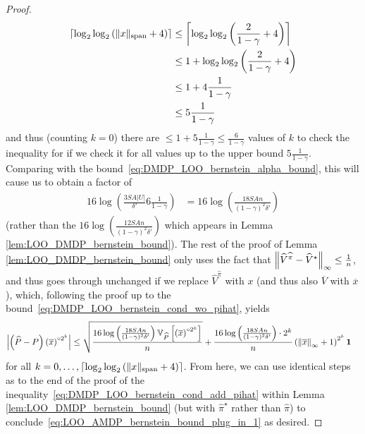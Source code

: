 \documentclass{article}
\theoremstyle{plain}
\theoremstyle{plain}
\theoremstyle{remark}
\theoremstyle{plain}
\theoremstyle{plain}
\newcommand{\Var}{\mathbb{V}}
\newcommand{\Phat}{\widehat{P}}
\newcommand{\Vhat}{\widehat{V}}
\newcommand{\pihstar}{\widehat{\pi}^\star}
\newcommand{\one}{\mathbf{1}}
\newcommand{\pihat}{\widehat{\pi}}
\newcommand{\Vc}{\overline{V}}
\newcommand{\ox}{\overline{x}}
\begin{document}
\begin{proof}
\begin{align*}
    \left\lceil\log_2 \log_2 \left( \Vert x\Vert _{\textnormal{span}} + 4\right) \right\rceil &\leq \left\lceil\log_2 \log_2 \left( \frac{2}{1-\gamma} + 4\right) \right\rceil \\
     &\leq 1 + \log_2 \log_2 \left( \frac{2}{1-\gamma} + 4\right) \\
     &\leq 1 + 4 \frac{1}{1-\gamma} \\
     & \leq 5 \frac{1}{1-\gamma} 
    \end{align*}
    and thus (counting $k = 0$) there are $\leq 1 + 5 \frac{1}{1-\gamma} \leq \frac{6}{1-\gamma}$ values of $k$ to check the inequality for if we check it for all values up to the upper bound $5 \frac{1}{1-\gamma}$. Comparing with the bound~\eqref{eq:DMDP_LOO_bernstein_alpha_bound}, this will cause us to obtain a factor of
    \begin{align*}
        16 \log \left(\frac{3 SA |U|}{\delta'} 6 \frac{1}{1-\gamma} \right) & = 16 \log \left(\frac{18 SA n}{(1-\gamma)^2\delta'} \right)
    \end{align*}
    (rather than the $16 \log \left(\frac{12 SA n}{(1-\gamma)^2\delta'} \right)$ which appears in Lemma \ref{lem:LOO_DMDP_bernstein_bound}).
    The rest of the proof of Lemma \ref{lem:LOO_DMDP_bernstein_bound} only uses the fact that $\infnorm{\Vhat^{\pihat} - \Vhat^{\star}} \leq \frac{1}{n}$, and thus goes through unchanged if we replace $\Vhat^{\pihat}$ with $x$ (and thus also $\Vc$ with $\ox$), which, following the proof up to the bound~\eqref{eq:DMDP_LOO_bernstein_cond_wo_pihat}, yields
    \begin{align*}
        \left| \left(\Phat - P\right) \left( \ox \right)^{\circ 2^k} \right|
    &\leq \sqrt{\frac{16 \log \left(\frac{18 SA n}{(1-\gamma)^2\delta'} \right)   \Var_{\Phat} \left[ \left(\ox \right)^{\circ 2^k}  \right]    }{n }} + \frac{ 16 \log \left(\frac{18 SA n}{(1-\gamma)^2\delta'} \right) \cdot 2^k }{n}  \left( \infnorm{\ox} + 1\right)^{2^k}   \one
    \end{align*}
    for all $k = 0, \dots, \left\lceil\log_2 \log_2 \left( \Vert x\Vert _{\textnormal{span}} + 4\right) \right\rceil$. From here, we can use identical steps as to the end of the proof of the inequality~\eqref{eq:DMDP_LOO_bernstein_cond_add_pihat} within Lemma \ref{lem:LOO_DMDP_bernstein_bound} (but with $\pihstar$ rather than $\pihat$) to conclude~\eqref{eq:LOO_AMDP_bernstein_bound_plug_in_1} as desired. 


\end{proof}
\end{document}
